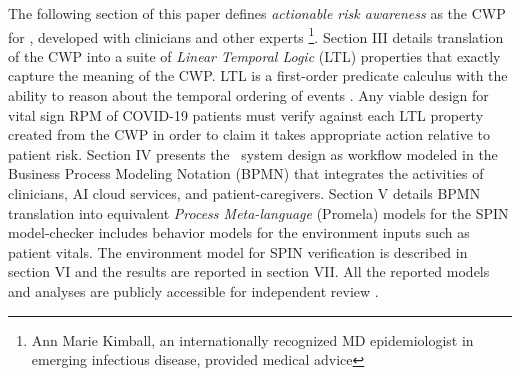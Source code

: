 The following section of this paper defines \emph{actionable risk awareness} as the CWP for \phware, developed with clinicians and other experts \footnote{Ann Marie Kimball, an internationally recognized MD epidemiologist in emerging infectious disease, provided medical advice}.
Section III details translation of the CWP into a suite of \emph{Linear Temporal Logic} (LTL) properties that exactly capture the meaning of the CWP.
LTL is a first-order predicate calculus with the ability to reason about the temporal ordering of events \cite{10.5555/975331}.
Any viable design for vital sign RPM of COVID-19 patients must verify against each LTL property created from the CWP in order to claim it takes appropriate action relative to patient risk.
Section IV presents the \phware\ system design as workflow modeled in the Business Process Modeling Notation (BPMN) \cite{BPMN} that integrates the activities of clinicians, AI cloud services, and patient-caregivers.
Section V details BPMN translation into equivalent \emph{Process Meta-language} (Promela) models for the SPIN model-checker \cite{spin} includes behavior models for the environment inputs such as patient vitals. 
The environment model for SPIN verification is described in section VI and the results are reported in section VII.
All the reported models and analyses are publicly accessible for independent review \cite{repo}.